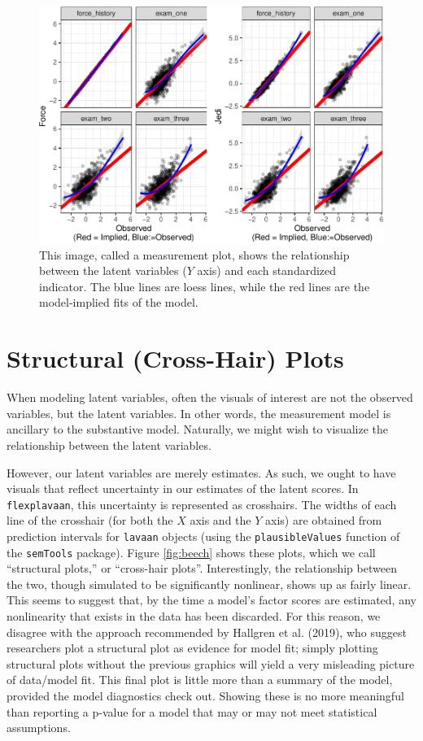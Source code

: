 \documentclass[
  english,
  doc]{apa6}
\begin{document}
\begin{figure}
\centering
\includegraphics{flexplavaan_draft_files/figure-latex/measurementplot-1.pdf}
\caption{\label{fig:measurementplot}This image, called a measurement plot, shows the relationship between the latent variables (\(Y\) axis) and each standardized indicator. The blue lines are loess lines, while the red lines are the model-implied fits of the model.}
\end{figure}

\hypertarget{structural-cross-hair-plots}{%
\section{Structural (Cross-Hair) Plots}\label{structural-cross-hair-plots}}

When modeling latent variables, often the visuals of interest are not the observed variables, but the latent variables. In other words, the measurement model is ancillary to the substantive model. Naturally, we might wish to visualize the relationship between the latent variables.

However, our latent variables are merely estimates. As such, we ought to have visuals that reflect uncertainty in our estimates of the latent scores. In \texttt{flexplavaan}, this uncertainty is represented as crosshairs. The widths of each line of the crosshair (for both the \(X\) axis and the \(Y\) axis) are obtained from prediction intervals for \texttt{lavaan} objects (using the \texttt{plausibleValues} function of the \texttt{semTools} package). Figure \ref{fig:beech} shows these plots, which we call ``structural plots,'' or ``cross-hair plots''. Interestingly, the relationship between the two, though simulated to be significantly nonlinear, shows up as fairly linear. This seems to suggest that, by the time a model's factor scores are estimated, any nonlinearity that exists in the data has been discarded. For this reason, we disagree with the approach recommended by Hallgren et al. (2019), who suggest researchers plot a structural plot as evidence for model fit; simply plotting structural plots without the previous graphics will yield a very misleading picture of data/model fit. This final plot is little more than a summary of the model, provided the model diagnostics check out. Showing these is no more meaningful than reporting a p-value for a model that may or may not meet statistical assumptions.
\end{document}
